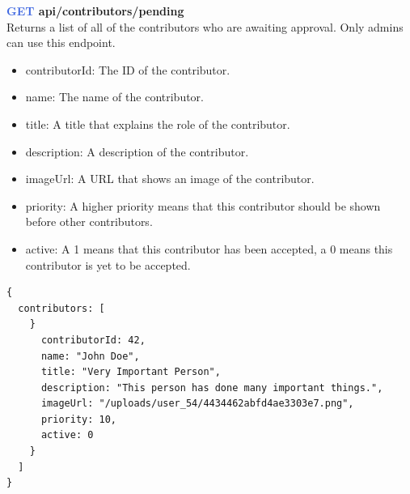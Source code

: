 \documentclass[onecolumn, draftclsnofoot,10pt, compsoc, usenames, dvipsnames]{IEEEtran}
\begin{document}
\noindent
\textbf{\textcolor{RoyalBlue}{GET} api/contributors/pending} \\
Returns a list of all of the contributors who are awaiting approval. Only admins can use this endpoint.
\begin{itemize}
    \item contributorId: The ID of the contributor.
    \item name: The name of the contributor.
    \item title: A title that explains the role of the contributor.
    \item description: A description of the contributor.
    \item imageUrl: A URL that shows an image of the contributor.
    \item priority: A higher priority means that this contributor should be shown before other contributors.
    \item active: A 1 means that this contributor has been accepted, a 0 means this contributor is yet to be accepted.
\end{itemize}
\begin{lstlisting}[caption=Example Response]
{
  contributors: [
    }
      contributorId: 42,
      name: "John Doe",
      title: "Very Important Person",
      description: "This person has done many important things.",
      imageUrl: "/uploads/user_54/4434462abfd4ae3303e7.png",
      priority: 10,
      active: 0
    }
  ]
}
\end{lstlisting}
\\~\\
\end{document}
